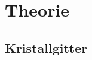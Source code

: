 \section{Theorie}
\label{sec:Theorie}

\subsection{Kristallgitter}
\label{subsec:kristallstrukturen}

\subsection{}

\cite{sample}
